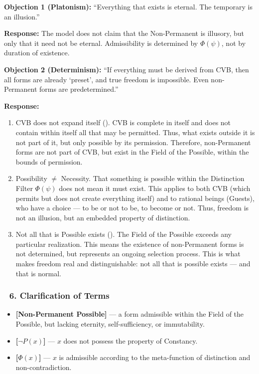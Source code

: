 \documentclass[12pt]{article}
\begin{document}
\textbf{Objection 1 (Platonism):}
``Everything that exists is eternal. The temporary is an illusion.''

\textbf{Response:}
The model does not claim that the Non-Permanent is illusory, but only that it need not be eternal. Admissibility is determined by $\Phi(\psi)$, not by duration of existence.

\textbf{Objection 2 (Determinism):}
``If everything must be derived from CVB, then all forms are already ‘preset’, and true freedom is impossible. Even non-Permanent forms are predetermined.''

\textbf{Response:}
\begin{enumerate}
\item CVB does not expand itself (\text{[13]}).  
CVB is complete in itself and does not contain within itself all that may be permitted.  
Thus, what exists outside it is not part of it, but only possible by its permission.  
Therefore, non-Permanent forms are not part of CVB, but exist in the Field of the Possible, within the bounds of permission.

\item Possibility $\neq$ Necessity.  
That something is possible within the Distinction Filter $\Phi(\psi)$ does not mean it must exist.  
This applies to both CVB (which permits but does not create everything itself) and to rational beings (Guests), who have a choice — to be or not to be, to become or not.  
Thus, freedom is not an illusion, but an embedded property of distinction.

\item Not all that is Possible exists (\text{[7]}).  
The Field of the Possible exceeds any particular realization.  
This means the existence of non-Permanent forms is not determined, but represents an ongoing selection process.  
This is what makes freedom real and distinguishable: not all that is possible exists — and that is normal.
\end{enumerate}

\subsubsection*{🔹 6. Clarification of Terms}

\begin{itemize}
\item \textbf{[Non-Permanent Possible]} — a form admissible within the Field of the Possible, but lacking eternity, self-sufficiency, or immutability.
\item \textbf{[$\neg P(x)$]} — $x$ does not possess the property of Constancy.
\item \textbf{[$\Phi(x)$]} — $x$ is admissible according to the meta-function of distinction and non-contradiction.
\end{itemize}
\end{document}
